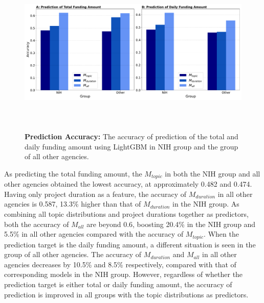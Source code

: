 \begin{figure}[H]
    \centering
    \includegraphics[width = 17cm, height = 8cm]{./img/accuracy_daily.pdf}
    \caption[The accuracy of prediction of funding amount using LightGBM]{\textbf{Prediction Accuracy:} The accuracy of prediction of the total and daily funding amount using LightGBM in NIH group and the group of all other agencies.}
\end{figure}

As predicting the total funding amount, the $M_{topic}$ in both the NIH group and all other agencies obtained the lowest accuracy, at approximately 0.482 and 0.474. Having only project duration as a feature, the accuracy of $M_{duration}$ in all other agencies is 0.587, 13.3\% higher than that of $M_{duration}$ in the NIH group. As combining all topic distributions and project durations together as predictors, both the accuracy of $M_{all}$ are beyond 0.6, boosting 20.4\% in the NIH group and 5.5\% in all other agencies compared with the accuracy of $M_{topic}$. When the prediction target is the daily funding amount, a different situation is seen in the group of all other agencies. The accuracy of $M_{duration}$ and $M_{all}$ in all other agencies decreases by 10.5\% and 8.5\% respectively, compared with that of corresponding models in the NIH group. However, regardless of whether the prediction target is either total or daily funding amount, the accuracy of prediction is improved in all groups with the topic distributions as predictors.
